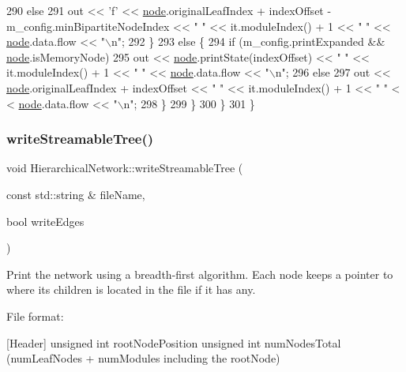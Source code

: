 \begin{DoxyCode}
290                 \textcolor{keywordflow}{else}
291                     out << \textcolor{charliteral}{'f'} << \mbox{\hyperlink{structnode}{node}}.originalLeafIndex + indexOffset - m\_config.minBipartiteNodeIndex
       << \textcolor{stringliteral}{" "} << it.moduleIndex() + 1 << \textcolor{stringliteral}{" "} << \mbox{\hyperlink{structnode}{node}}.data.flow << \textcolor{stringliteral}{"\(\backslash\)n"};
292             \}
293             \textcolor{keywordflow}{else} \{
294                 \textcolor{keywordflow}{if} (m\_config.printExpanded && \mbox{\hyperlink{structnode}{node}}.isMemoryNode)
295                     out << \mbox{\hyperlink{structnode}{node}}.printState(indexOffset) << \textcolor{stringliteral}{" "} << it.moduleIndex() + 1 << \textcolor{stringliteral}{" "} << 
      \mbox{\hyperlink{structnode}{node}}.data.flow << \textcolor{stringliteral}{"\(\backslash\)n"};
296                 \textcolor{keywordflow}{else}
297                     out << \mbox{\hyperlink{structnode}{node}}.originalLeafIndex + indexOffset << \textcolor{stringliteral}{" "} << it.moduleIndex() + 1 << \textcolor{stringliteral}{" "} <
      < \mbox{\hyperlink{structnode}{node}}.data.flow << \textcolor{stringliteral}{"\(\backslash\)n"};
298             \}
299         \}
300     \}
301 \}
\end{DoxyCode}
\mbox{\label{classHierarchicalNetwork_af9dcdae2d598bdfd3af540a07e10b42f}} 
\subsubsection{\texorpdfstring{write\+Streamable\+Tree()}{writeStreamableTree()}}
{\footnotesize\ttfamily void Hierarchical\+Network\+::write\+Streamable\+Tree (\begin{DoxyParamCaption}\item[{const std\+::string \&}]{file\+Name,  }\item[{bool}]{write\+Edges }\end{DoxyParamCaption})}

Print the network using a breadth-\/first algorithm. Each node keeps a pointer to where its children is located in the file if it has any.

File format\+:

\mbox{[}Header\mbox{]} unsigned int root\+Node\+Position unsigned int num\+Nodes\+Total (num\+Leaf\+Nodes + num\+Modules including the root\+Node)


